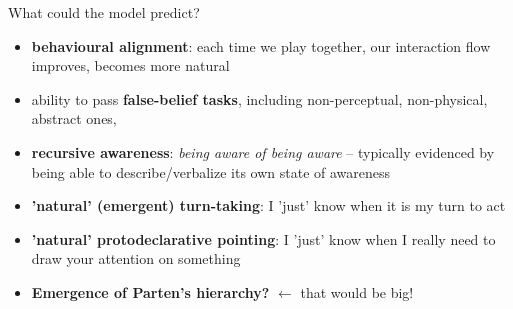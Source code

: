 \documentclass[handout,compress]{beamer}
\begin{document}
\begin{frame}{What could the model predict?}

    \begin{itemize}

        \item {\bf behavioural alignment}: each time we play together, our
            interaction flow improves, becomes more natural

        \item ability to pass {\bf false-belief tasks}, including
            non-perceptual, non-physical, abstract ones,

        \item {\bf recursive awareness}: \emph{being aware of being aware} -- typically
            evidenced by being able to describe/verbalize its own state of
            awareness 

        \item {\bf 'natural' (\ie emergent) turn-taking}: I 'just' know when it is my
            turn to act

        \item {\bf 'natural' protodeclarative pointing}: I 'just' know when I really
            need to draw your attention on something

        \item<+-> {\bf Emergence of Parten's hierarchy?} $\leftarrow$ that would be
            big!

    \end{itemize}

\end{frame}









\end{document}
